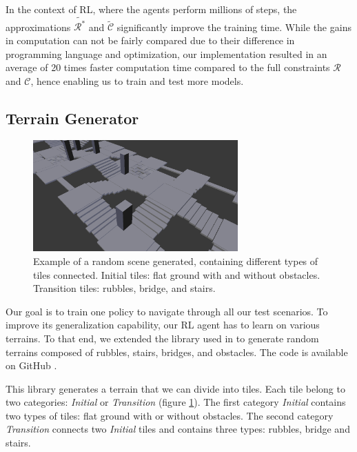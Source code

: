 In the context of RL, where the agents perform millions of steps, the approximations $\tilde{\mathcal{R}^*}$ and $\tilde{\mathcal{C}}$ significantly improve the training time.
While the gains in computation can not be fairly compared due to their difference in programming language and optimization, our implementation resulted in an average of 20 times faster computation time compared to the full constraints $\mathcal{R}$ and $\mathcal{C}$, hence enabling us to train and test more models.

\subsection{Terrain Generator\label{subsub:terrain_generator}}

\begin{figure}[ht]
    \centering
    \includegraphics[width=0.7\textwidth]{Figures/Chapter_LEAS/random_scene_tiles_example.png}
    \caption{Example of a random scene generated, containing different types of tiles connected. Initial tiles: flat ground with and without obstacles. Transition tiles: rubbles, bridge, and stairs.}
    \label{fig:random_scene_gene_tiles_example}
\end{figure}

Our goal is to train one policy to navigate through all our test scenarios.
To improve its generalization capability, our RL agent has to learn on various terrains. 
To that end, we extended the library used in \cite{sl1m_v2} to generate random terrains composed of rubbles, stairs, bridges, and obstacles. The code is available on GitHub \cite{random_scene_gen}.

This library generates a terrain that we can divide into tiles. 
Each tile belong to two categories: \textit{Initial} or \textit{Transition} (figure \ref{fig:random_scene_gene_tiles_example}). 
The first category \textit{Initial} contains two types of tiles: flat ground with or without obstacles. 
The second category \textit{Transition} connects two \textit{Initial} tiles and contains three types: rubbles, bridge and stairs.

